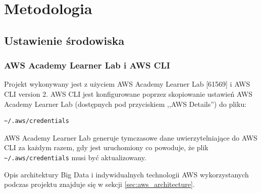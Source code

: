 \documentclass[12pt, a4paper]{article}
\begin{document}






\section{Metodologia}

\subsection{Ustawienie środowiska}
\subsubsection{AWS Academy Learner Lab i AWS CLI}
Projekt wykonywany jest z użyciem AWS Academy Learner Lab [61569] i AWS CLI version 2. AWS CLI jest konfigurowane poprzez skopiowanie ustawień AWS Academy Learner Lab (dostępnych pod przyciskiem ,,AWS Details'') do  pliku:
\begin{verbatim}
~/.aws/credentials
\end{verbatim}
AWS Academy Learner Lab generuje tymczasowe dane uwierzytelniające do AWS CLI za każdym razem, gdy jest uruchomiony co powoduje, że plik \verb|~/.aws/credentials| musi być aktualizowany.



Opis architektury Big Data i indywidualnych technologii AWS wykorzystanych podczas projektu znajduje się w sekcji \ref{sec:aws_architecture}.
\end{document}
